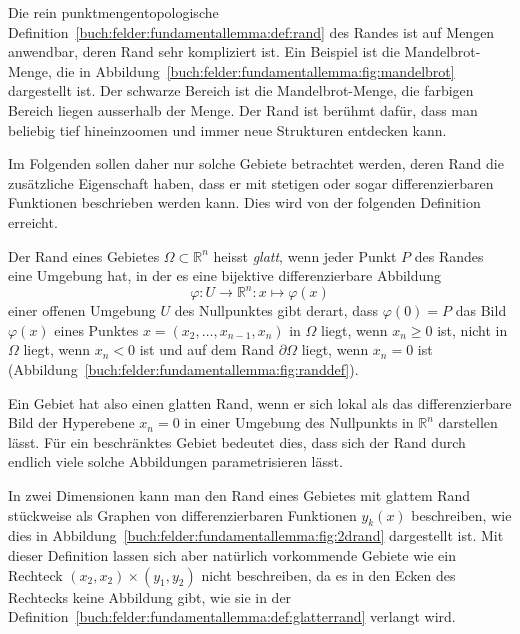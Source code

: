 Die rein punktmengentopologische 
%
Definition~\ref{buch:felder:fundamentallemma:def:rand} des Randes ist
auf Mengen anwendbar, deren Rand sehr kompliziert ist.
Ein Beispiel ist die Mandelbrot-Menge, die in
Abbildung~\ref{buch:felder:fundamentallemma:fig:mandelbrot}
dargestellt ist.
Der schwarze Bereich ist die Mandelbrot-Menge, die farbigen Bereich
liegen ausserhalb der Menge.
Der Rand ist berühmt dafür, dass man beliebig tief hineinzoomen
und immer neue Strukturen entdecken kann.

Im Folgenden sollen daher nur solche Gebiete betrachtet werden,
deren Rand die zusätzliche Eigenschaft haben, dass er mit stetigen
oder sogar differenzierbaren Funktionen beschrieben werden kann.
Dies wird von der folgenden Definition erreicht.


\begin{definition}
\label{buch:felder:fundamentallemma:def:glatterrand}
Der Rand eines Gebietes $\Omega\subset\mathbb{R}^n$ heisst {\em glatt},
wenn jeder Punkt $P$ des Randes eine Umgebung hat, in der es eine bijektive
differenzierbare Abbildung
\[
\varphi
\colon
U\to \mathbb{R}^n 
:
x\mapsto \varphi(x)
\]
einer offenen Umgebung $U$ des Nullpunktes gibt derart, dass $\varphi(0)=P$
das Bild $\varphi(x)$ eines Punktes $x=(x_2,\dots,x_{n-1},x_n)$ in $\Omega$
liegt, wenn $x_n\ge 0$ ist, nicht in $\Omega$ liegt, wenn $x_n<0$ ist und auf
dem Rand $\partial\Omega$ liegt, wenn $x_n=0$ ist
(Abbildung~\ref{buch:felder:fundamentallemma:fig:randdef}).
\end{definition}

Ein Gebiet hat also einen glatten Rand, wenn er sich lokal als das
differenzierbare Bild der Hyperebene $x_n=0$ in einer Umgebung des
Nullpunkts in $\mathbb{R}^n$ darstellen lässt.
Für ein beschränktes Gebiet bedeutet dies, dass sich der Rand durch
endlich viele solche Abbildungen parametrisieren lässt.

In zwei Dimensionen kann man den Rand eines Gebietes mit
glattem Rand stückweise als Graphen von differenzierbaren Funktionen
$y_k(x)$ beschreiben, wie dies in
%
Abbildung~\ref{buch:felder:fundamentallemma:fig:2drand}
dargestellt ist.
Mit dieser Definition lassen sich aber natürlich vorkommende Gebiete
wie ein Rechteck $(x_2,x_2)\times(y_1,y_2)$ nicht beschreiben, da
es in den Ecken des Rechtecks keine Abbildung gibt, wie sie in der
Definition~\ref{buch:felder:fundamentallemma:def:glatterrand}
verlangt wird.

